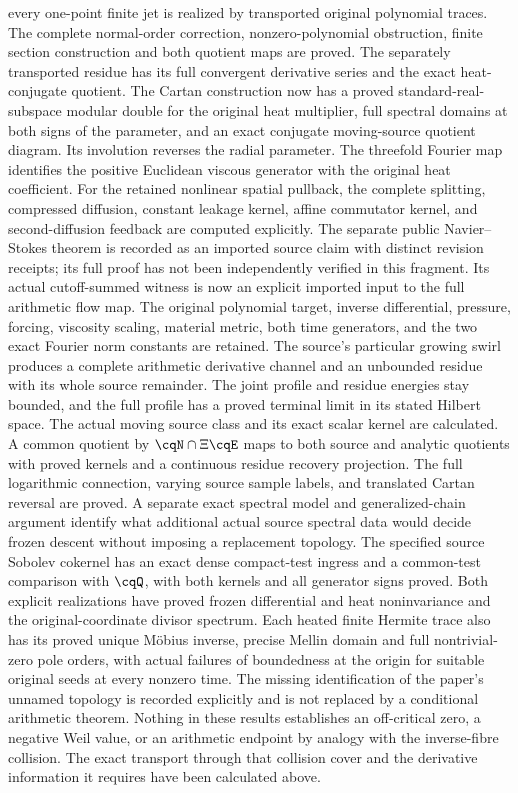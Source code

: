every one-point finite jet is realized by transported original
polynomial traces. The complete normal-order correction,
nonzero-polynomial obstruction, finite section construction
and both quotient maps are proved. The separately transported
residue has its full convergent derivative series and the
exact heat-conjugate quotient.
The Cartan construction now has a proved standard-real-subspace
modular double for the original heat multiplier, full spectral
domains at both signs of the parameter, and an exact conjugate
moving-source quotient diagram. Its involution reverses the radial
parameter. The threefold Fourier map identifies the positive
Euclidean viscous generator with the original heat coefficient.
For the retained nonlinear spatial pullback, the complete splitting,
compressed diffusion, constant leakage kernel, affine commutator
kernel, and second-diffusion feedback are computed explicitly.
The separate public Navier--Stokes theorem is recorded as an
imported source claim with distinct revision receipts; its full
proof has not been independently verified in this fragment.
Its actual cutoff-summed witness is now an explicit imported
input to the full arithmetic flow map. The original polynomial
target, inverse differential, pressure, forcing, viscosity scaling,
material metric, both time generators, and the two exact Fourier
norm constants are retained. The source's particular growing
swirl produces a complete arithmetic derivative channel and an
unbounded residue with its whole source remainder. The joint
profile and residue energies stay bounded, and the full profile
has a proved terminal limit in its stated Hilbert space.
The actual moving source class and its exact scalar kernel are
calculated. A common quotient by $\cqN\cap\Xi\cqE$ maps to both
source and analytic quotients with proved kernels and a continuous
residue recovery projection. The full logarithmic connection,
varying source sample labels, and translated Cartan reversal
are proved. A separate exact spectral model and generalized-chain
argument identify what additional actual source spectral data
would decide frozen descent without imposing a replacement topology.
The specified source Sobolev cokernel has an exact dense
compact-test ingress and a common-test comparison with $\cqQ$,
with both kernels and all generator signs proved.
Both explicit realizations have proved frozen differential and
heat noninvariance and the original-coordinate divisor spectrum.
Each heated finite Hermite trace also has its proved unique
M\"obius inverse, precise Mellin domain and full nontrivial-zero
pole orders, with actual failures of boundedness at the origin
for suitable original seeds at every nonzero time.
The missing identification of the paper's unnamed topology is
recorded explicitly and is not replaced by a conditional arithmetic
theorem. Nothing in these results establishes an off-critical zero,
a negative Weil value, or an arithmetic endpoint by analogy with
the inverse-fibre collision. The exact transport through that
collision cover and the derivative information it requires have
been calculated above.


